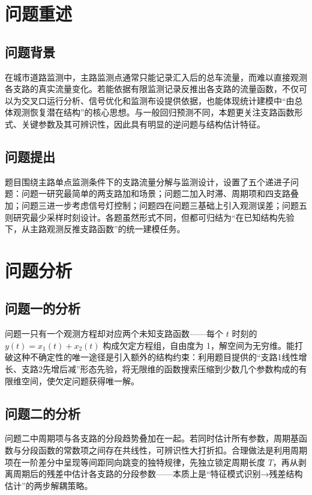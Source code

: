 \documentclass[UTF8,a4paper,fontset=none]{ctexart}
\numberwithin{equation}{section}
\begin{document}

\clearpage

\section{问题重述}
\subsection{问题背景}
在城市道路监测中，主路监测点通常只能记录汇入后的总车流量，而难以直接观测各支路的真实流量变化。若能依据有限监测记录反推出各支路的流量函数，不仅可以为交叉口运行分析、信号优化和监测布设提供依据，也能体现统计建模中``由总体观测恢复潜在结构”的核心思想。与一般回归预测不同，本题更关注支路函数形式、关键参数及其可辨识性，因此具有明显的逆问题与结构估计特征\cite{refOD1,refOD2}。

\subsection{问题提出}
题目围绕主路单点监测条件下的支路流量分解与监测设计，设置了五个递进子问题：问题一研究最简单的两支路加和场景；问题二加入时滞、周期项和四支路叠加；问题三进一步考虑信号灯控制；问题四在问题三基础上引入观测误差；问题五则研究最少采样时刻设计。各题虽然形式不同，但都可归结为``在已知结构先验下，从主路观测反推支路函数”的统一建模任务。

\section{问题分析}
\subsection{问题一的分析}
问题一只有一个观测方程却对应两个未知支路函数——每个 $t$ 时刻的 $y(t)=x_1(t)+x_2(t)$ 构成欠定方程组，自由度为 1，解空间为无穷维。能打破这种不确定性的唯一途径是引入额外的结构约束：利用题目提供的``支路1线性增长、支路2先增后减''形态先验，将无限维的函数搜索压缩到少数几个参数构成的有限维空间，使欠定问题获得唯一解。

\subsection{问题二的分析}
问题二中周期项与各支路的分段趋势叠加在一起。若同时估计所有参数，周期基函数与分段函数的常数项之间存在共线性，可辨识性大打折扣。合理做法是利用周期项在一阶差分中呈现等间距同向跳变的独特规律，先独立锁定周期长度 $T$，再从剥离周期后的残差中估计各支路的分段参数——本质上是``特征模式识别→残差结构估计''的两步解耦策略\cite{refDyn1,refBreak}。
\end{document}
